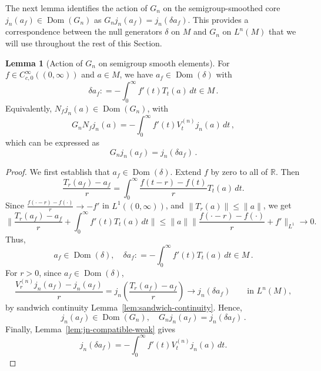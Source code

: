 \documentclass[11pt,a4paper]{article}
\theoremstyle{plain}
\numberwithin{theorem}{section}
\theoremstyle{definition}
\newtheorem{lemma}[theorem]{Lemma}
\newcommand{\?}{\overset{?}{=}}
\newcommand{\defeq}{\mathrel{\mathop:}=}
\newcommand{\lb}{\left (}
\newcommand{\rb}{\right )}
\newcommand{\I}{\infty}
\renewcommand{\d}{\delta}	%
\DeclareMathOperator{\Dom}{Dom}
\begin{document}
The next lemma identifies the action of $G_n$ on the semigroup-smoothed core $j_n(a_f) \in \Dom(G_n)$ as $G_n j_n(a_f) = j_n(\delta a_f)$. This provides a correspondence between the null generators $\delta$ on $M$ and $G_n$ on $L^n(M)$ that we will use throughout the rest of this Section.
\begin{lemma}[Action of $G_n$ on semigroup smooth elements]
\label{lem:null-smoothing-fixed}
For $f\in C_{c,0}^\infty((0,\infty))$ and $a\in M$, we have $a_f\in\Dom(\d)$ with
\begin{equation}\label{eq:delta-af-defn}
    \delta a_f\defeq -\int_0^\infty f'(t)T_t(a)\,dt\in M\,.
\end{equation}
Equivalently, $N_fj_n(a)\in\Dom(G_n)$, with
\begin{equation}\label{eq:Gn-Nf-jn-a}
  G_nN_fj_n(a) = -\int_0^\infty f'(t)V_t^{(n)}j_n(a)\,dt\,,
\end{equation}
which can be expressed as
\begin{equation}\label{eq:delta-defn}
  G_nj_n(a_f)=j_n(\delta a_f)\,.
\end{equation}
\end{lemma}
\begin{proof}
We first establish that $a_f\in \Dom(\delta)$. Extend $f$ by zero to all of $\mathbb R$. Then
\begin{equation*}
    \frac{T_r(a_f)-a_f}{r}=\int_0^\I \frac{f(t-r)-f(t)}{r} T_t(a)\, dt.
\end{equation*}
Since $\frac{f(\cdot-r)-f(\cdot)}{r} \to -f'$ in $L^1((0,\I))$, and $\|T_r(a)\|\leq \|a\| $, we get
\begin{equation*}
    \Big\|\frac{T_r(a_f)-a_f}{r}+ \int_0^\I f'(t) T_t(a)\,dt\Big \| \leq \|a\| \Big\| \frac{f(\cdot-r)-f(\cdot)}{r}+f' \Big\|_{L^1} \to 0.
\end{equation*}
Thus,
\begin{equation*}
    a_f\in \Dom (\delta), \quad \delta a_f\defeq -\int_0^\infty f'(t)T_t(a)\,dt\in M\,.
\end{equation*}
For $r>0$, since $a_f\in \Dom(\delta)$,
\begin{equation*}
    \frac{V_r^{(n)}j_n(a_f)-j_n(a_f)}{r}=j_n \lb \frac{T_r(a_f)-a_f}{r}\rb \longrightarrow j_n(\delta a_f) \qquad\text{in }L^n(M),
\end{equation*}
by sandwich continuity Lemma~\ref{lem:sandwich-continuity}. Hence,
\begin{equation*}
    j_n(a_f) \in \Dom(G_n), \quad G_n j_n(a_f)= j_n(\delta a_f) \,.
\end{equation*}
Finally, Lemma~\ref{lem:jn-compatible-weak} gives
\begin{equation*}
    j_n(\delta a_f)= -\int_0^\I f'(t) V_t^{(n)} j_n(a)\, dt. 
\end{equation*}
\end{proof}
\end{document}
